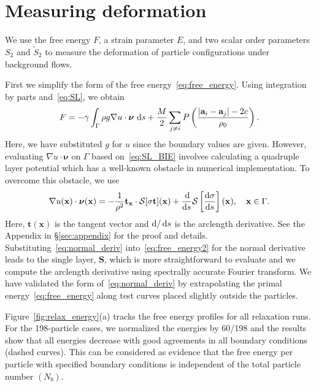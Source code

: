 \documentclass[prb,preprint,showpacs,preprintnumbers,amsmath,amssymb,longbibliography]{revtex4-1}
\renewcommand{\aa}{\mathbf{a}}
\newcommand{\DD}{\mathcal{D}}
\newcommand{\SSS}{\mathcal{S}}
\newcommand{\nnu}{\boldsymbol{\nu}}
\renewcommand{\SS}{\mathbf{S}}
\newcommand{\xx}{\mathbf{x}}
\renewcommand{\tt}{\mathbf{t}}
\begin{document}
\section{Measuring deformation}
We use the free energy $F$, a strain parameter $E$, and two scalar order
parameters $S_{2}$ and $\tilde S_2$ to measure the deformation of
particle configurations under background flows. 

First we simplify the form of the free energy~\eqref{eq:free_energy}.
Using integration by parts and~\eqref{eq:SL}, we obtain
\begin{equation}
\label{eq:free_energy2}
F = -\gamma
\int_{\Gamma} \rho g \nabla u \cdot \nnu \,\dif s
+ \frac{M}{2}
\sum_{j \neq i} 
P\left(\frac{|\aa_i - \aa_j|-2c}{\rho_0}\right).
\end{equation}
%
Here, we have substituted $g$ for $u$ since the boundary values are
given. However, evaluating $\nabla u \cdot \nnu$ on $\Gamma$ based
on~\eqref{eq:SL_BIE} involves calculating a quadruple layer potential
which has a well-known obstacle in numerical implementation.  To
overcome this obstacle, we use
%
\begin{equation}
\label{eq:normal_deriv}
\nabla u(\xx) \cdot \nnu(\xx)=
-\frac{1}{\rho^2} {\bf t}_\xx\cdot \SSS[\sigma{\bf t}](\xx)
+ \frac{\dif}{\dif s}\SSS\left[\frac{\dif \sigma}{\dif s}\right](\xx), \quad \xx \in \Gamma.
\end{equation}
%
Here, $\tt(\xx)$ is the tangent vector and $\dif/\dif s$ is the
arclength derivative. See the Appendix in \S\ref{sec:appendix} for the
proof and details. Substituting~\eqref{eq:normal_deriv}
into~\eqref{eq:free_energy2} for the normal derivative leads to the
single layer, $\SS$, which is more straightforward to evaluate and we
compute the arclength derivative using spectrally accurate Fourier
transform. We have validated the form of~\eqref{eq:normal_deriv} by
extrapolating the primal energy~\eqref{eq:free_energy} along test curves
placed slightly outside the particles.

Figure~\ref{fig:relax_energy}(a) tracks the free energy profiles for all
relaxation runs.  For the 198-particle cases, we normalized the energies
by 60/198 and the results show that all energies decrease with good
agreements in all boundary conditions (dashed curves).  This can be
considered as evidence that the free energy per particle with specified
boundary conditions is independent of the total particle number $(N_b)$.
\end{document}
